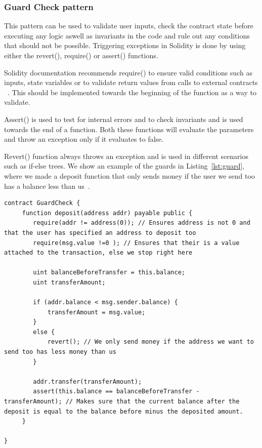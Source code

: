 \documentclass[10pt,conference]{IEEEtran}
\begin{document}
\subsubsection{Guard Check pattern}

This pattern can be used to validate user inputs, check the contract state before executing any logic aswell as invariants in the code and rule out any conditions that should not be possible. Triggering exceptions in Solidity is done by using either the revert(), require() or assert() functions. 

Solidity documentation recommends require() to ensure valid conditions such as inputs, state variables or to validate return values from calls to external contracts ~\cite{solidity}. This should be implemented towards the beginning of the function as a way to validate. 

Assert() is used to test for internal errors and to check invariants and is used towards the end of a function. Both these functions will evaluate the parameters and throw an exception only if it evaluates to false. 

Revert() function always throws an exception and is used in different scenarios such as if-else trees. We show an example of the guards in Listing~\ref{lst:guard}, where we made a deposit function that only sends money if the user we send too has a balance less than us~\cite{guardcheck}.

\begin{lstlisting}[language=Solidity, caption=Guard Check pattern, label={lst:guard}]
contract GuardCheck {
     function deposit(address addr) payable public {
        require(addr != address(0)); // Ensures address is not 0 and that the user has specified an address to deposit too
        require(msg.value !=0 ); // Ensures that their is a value attached to the transaction, else we stop right here
        
        uint balanceBeforeTransfer = this.balance;
        uint transferAmount;
        
        if (addr.balance < msg.sender.balance) {
            transferAmount = msg.value;
        }
        else {
            revert(); // We only send money if the address we want to send too has less money than us
        }
        
        addr.transfer(transferAmount);
        assert(this.balance == balanceBeforeTransfer - transferAmount); // Makes sure that the current balance after the deposit is equal to the balance before minus the deposited amount. 
     }
     
}
\end{lstlisting}
\end{document}

